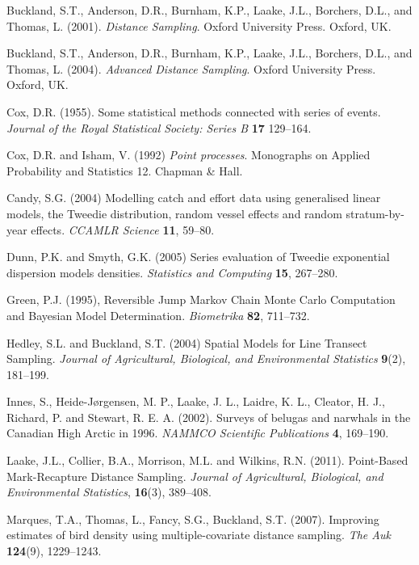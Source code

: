 \documentclass[useAMS,referee]{biom}
\begin{document}
\begin{thebibliography}{}
\bibitem{ } Buckland, S.T., Anderson, D.R., Burnham, K.P., Laake, J.L., Borchers, D.L., and Thomas, L.  (2001). \textit{Distance Sampling}. Oxford University Press. Oxford, UK.

\bibitem{ } Buckland, S.T., Anderson, D.R., Burnham, K.P., Laake, J.L., Borchers, D.L., and Thomas, L.  (2004). \textit{Advanced Distance Sampling}. Oxford University Press. Oxford, UK.

\bibitem{ } Cox, D.R. (1955). Some statistical methods connected with series of events. \textit{Journal of the Royal Statistical Society: Series B} \textbf{17} 129--164.

\bibitem{ } Cox, D.R. and Isham, V. (1992) \textit{Point processes}. Monographs on Applied Probability and Statistics 12. Chapman \& Hall.

\bibitem{ } Candy, S.G. (2004) Modelling catch and effort data using generalised linear models, the Tweedie distribution, random vessel effects and random stratum-by-year effects. \textit{CCAMLR Science} \textbf{11}, 59--80.

\bibitem{ } Dunn, P.K. and Smyth, G.K. (2005) Series evaluation of Tweedie exponential dispersion models densities. \textit{Statistics and Computing} \textbf{15}, 267--280.

\bibitem{} Green, P.J. (1995), Reversible Jump {M}arkov Chain {M}onte {C}arlo Computation and {B}ayesian Model Determination. \textit{Biometrika} \textbf{82}, 711--732.

\bibitem{ } Hedley, S.L. and Buckland, S.T. (2004) Spatial Models for Line Transect Sampling. \textit{Journal of Agricultural, Biological, and Environmental Statistics} \textbf{9}(2), 181--199.

\bibitem{ } Innes, S., Heide-J\o rgensen, M. P., Laake, J. L., Laidre, K. L., Cleator, H. J., Richard, P. and Stewart, R. E. A. (2002). Surveys of belugas and narwhals in the {C}anadian {H}igh {A}rctic in 1996. \textit{NAMMCO Scientific Publications} \textbf{4}, 169--190.

\bibitem{ } Laake, J.L., Collier, B.A., Morrison, M.L. and Wilkins, R.N. (2011). Point-Based Mark-Recapture Distance Sampling. \textit{Journal of Agricultural, Biological, and Environmental Statistics}, \textbf{16}(3), 389--408.

\bibitem{ } Marques, T.A., Thomas, L., Fancy, S.G., Buckland, S.T. (2007). Improving estimates of bird density using multiple-covariate distance sampling. \textit{The Auk} \textbf{124}(9), 1229--1243.


\end{thebibliography}
\end{document}
